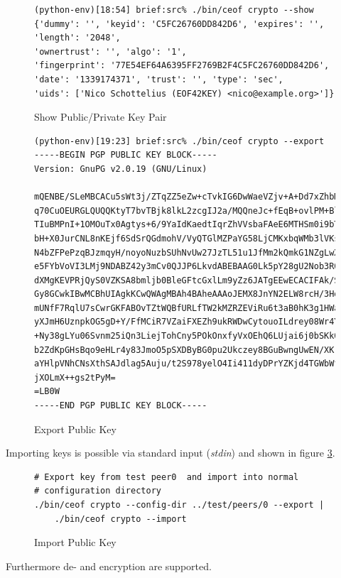 \begin{figure}[htbp]
\caption{Show Public/Private Key Pair}
\label{showkey}
\begin{verbatim}
(python-env)[18:54] brief:src% ./bin/ceof crypto --show
{'dummy': '', 'keyid': 'C5FC26760DD842D6', 'expires': '', 'length': '2048',
'ownertrust': '', 'algo': '1',
'fingerprint': '77E54EF64A6395FF2769B2F4C5FC26760DD842D6',
'date': '1339174371', 'trust': '', 'type': 'sec',
'uids': ['Nico Schottelius (EOF42KEY) <nico@example.org>']}
\end{verbatim}
\end{figure}
\begin{figure}[htbp]
\caption{Export Public Key}
\label{exportkey}
\begin{verbatim}
(python-env)[19:23] brief:src% ./bin/ceof crypto --export
-----BEGIN PGP PUBLIC KEY BLOCK-----
Version: GnuPG v2.0.19 (GNU/Linux)

mQENBE/SLeMBCACu5sWt3j/ZTqZZ5eZw+cTvkIG6DwWaeVZjv+A+Dd7xZhbMBeyZ
q70CuOEURGLQUQQKtyT7bvTBjk8lkL2zcgIJ2a/MQQneJc+fEqB+ovlPM+Bl4qLf
TIuBMPnI+1OMOuTx0Agtys+6/9YaIdKaedtIqrZhVVsbaFAeE6MTHSm0i9bTtvyk
bH+X0JurCNL8nKEjf6SdSrQGdmohV/VyQTGlMZPaYG58LjCMKxbqWMb3lVKsmyRr
N4bZFPePzqBJzmqyH/noyoNuzbSUhNvUw27JzTL51u1JfMm2kQmkG1NZgLwXg6/W
e5FYbVoVI3LMj9NDABZ42y3mCv0QJJP6LkvdABEBAAG0Lk5pY28gU2Nob3R0ZWxp
dXMgKEVPRjQyS0VZKSA8bmljb0BleGFtcGxlLm9yZz6JATgEEwECACIFAk/SLeMC
Gy8GCwkIBwMCBhUIAgkKCwQWAgMBAh4BAheAAAoJEMX8JnYN2ELW8rcH/3Hdanzp
mUNfF7RqlU7sCwrGKFABOvTZtWQBfURLfTW2kMZRZEViRu6t3aB0hK3g1HWaSBzb
yXJmH6UznpkOG5gD+Y/FfMCiR7VZaiFXEZh9ukRWDwCytouoILdrey08Wr4YQEDf
+Ny38gLYu06Svnm25iQn3LiejTohCny5POkOnxfyVxOEhQ6LUjai6j0bSKk05o62
b2ZdKpGHsBqo9eHLr4y83JmoO5pSXDByBG0pu2Ukczey8BGuBwngUwEN/XKrl1xZ
aYHlpVNhCNsXthSAJdlag5Auju/t2S978yelO4Ii411dyDPrYZKjd4TGWbWfeVpS
jXOLmX++gs2tPyM=
=LB0W
-----END PGP PUBLIC KEY BLOCK-----
\end{verbatim}
\end{figure}
Importing keys is possible via standard input (\textit{stdin})
and shown in figure \ref{importkey}.
\begin{figure}[htbp]
\caption{Import Public Key}
\label{importkey}
\begin{verbatim}
# Export key from test peer0  and import into normal
# configuration directory
./bin/ceof crypto --config-dir ../test/peers/0 --export | 
    ./bin/ceof crypto --import
\end{verbatim}
\end{figure}
Furthermore de- and encryption are supported.
